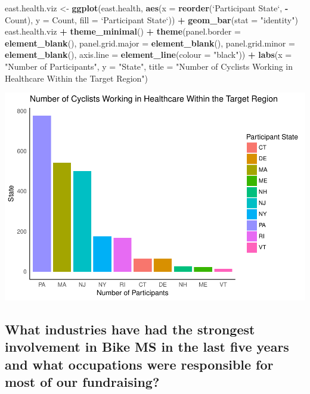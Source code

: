 \documentclass[]{article}
\newenvironment{Shaded}{\begin{snugshade}}{\end{snugshade}}
\newcommand{\KeywordTok}[1]{\textcolor[rgb]{0.13,0.29,0.53}{\textbf{#1}}}
\newcommand{\DataTypeTok}[1]{\textcolor[rgb]{0.13,0.29,0.53}{#1}}
\newcommand{\StringTok}[1]{\textcolor[rgb]{0.31,0.60,0.02}{#1}}
\newcommand{\OperatorTok}[1]{\textcolor[rgb]{0.81,0.36,0.00}{\textbf{#1}}}
\newcommand{\NormalTok}[1]{#1}
\begin{document}
\begin{Shaded}
\begin{Highlighting}[]
\NormalTok{east.health.viz <-}\StringTok{ }\KeywordTok{ggplot}\NormalTok{(east.health, }\KeywordTok{aes}\NormalTok{(}\DataTypeTok{x =} \KeywordTok{reorder}\NormalTok{(}\StringTok{`}\DataTypeTok{Participant State}\StringTok{`}\NormalTok{, }
    \OperatorTok{-}\NormalTok{Count), }\DataTypeTok{y =}\NormalTok{ Count, }\DataTypeTok{fill =} \StringTok{`}\DataTypeTok{Participant State}\StringTok{`}\NormalTok{)) }\OperatorTok{+}\StringTok{ }\KeywordTok{geom_bar}\NormalTok{(}\DataTypeTok{stat =} \StringTok{"identity"}\NormalTok{)}
\NormalTok{east.health.viz }\OperatorTok{+}\StringTok{ }\KeywordTok{theme_minimal}\NormalTok{() }\OperatorTok{+}\StringTok{ }\KeywordTok{theme}\NormalTok{(}\DataTypeTok{panel.border =} \KeywordTok{element_blank}\NormalTok{(), }
    \DataTypeTok{panel.grid.major =} \KeywordTok{element_blank}\NormalTok{(), }\DataTypeTok{panel.grid.minor =} \KeywordTok{element_blank}\NormalTok{(), }
    \DataTypeTok{axis.line =} \KeywordTok{element_line}\NormalTok{(}\DataTypeTok{colour =} \StringTok{"black"}\NormalTok{)) }\OperatorTok{+}\StringTok{ }\KeywordTok{labs}\NormalTok{(}\DataTypeTok{x =} \StringTok{"Number of Participants"}\NormalTok{, }
    \DataTypeTok{y =} \StringTok{"State"}\NormalTok{, }\DataTypeTok{title =} \StringTok{"Number of Cyclists Working in Healthcare Within the Target Region"}\NormalTok{)}
\end{Highlighting}
\end{Shaded}

\includegraphics{index_files/figure-latex/healthy.east-1.pdf}

\hypertarget{what-industries-have-had-the-strongest-involvement-in-bike-ms-in-the-last-five-years-and-what-occupations-were-responsible-for-most-of-our-fundraising}{%
\subsection{What industries have had the strongest involvement in Bike
MS in the last five years and what occupations were responsible for most
of our
fundraising?}\label{what-industries-have-had-the-strongest-involvement-in-bike-ms-in-the-last-five-years-and-what-occupations-were-responsible-for-most-of-our-fundraising}}
\end{document}
